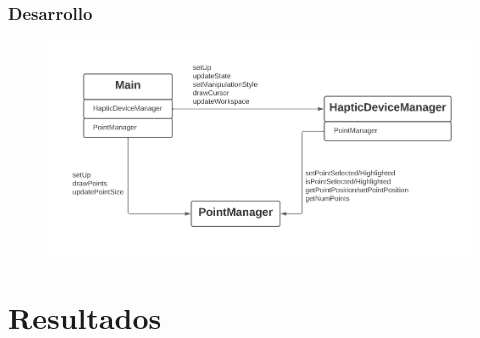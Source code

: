 \documentclass{beamer}
\begin{document}
\begin{frame}
	\frametitle{Desarrollo}
		\begin{figure}
		\centering
		\includegraphics[width=\textwidth]{diagrama}
	\end{figure}
	
\end{frame}
\section{Resultados}
\end{document}
